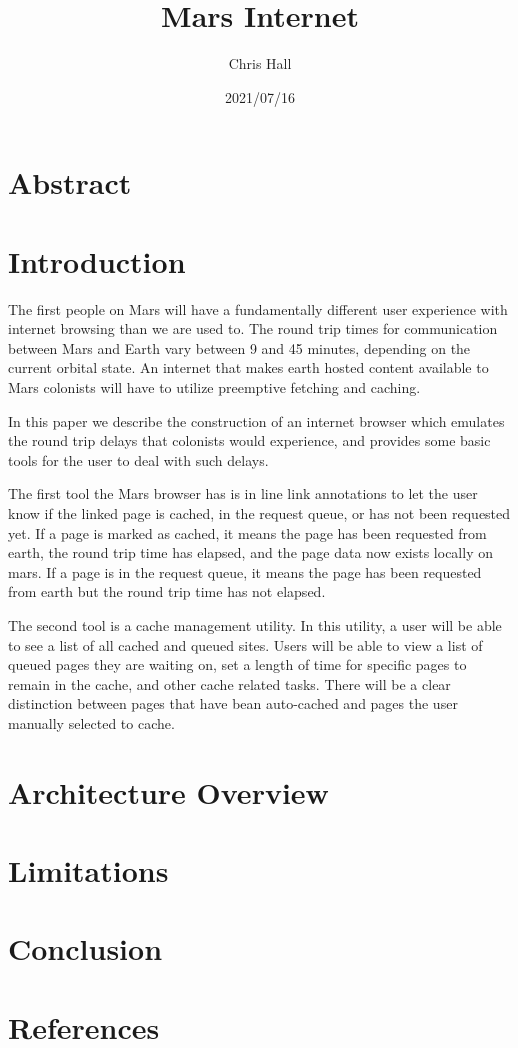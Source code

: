 \documentclass{article}
\title{Mars Internet}
\date{2021/07/16}
\author{Chris Hall}
\begin{document}
\maketitle

\section{Abstract}

\section{Introduction}

The first people on Mars will have a fundamentally different user experience with internet browsing than we are used to. The round trip times for communication between Mars and Earth vary between 9 and 45 minutes, depending on the current orbital state. An internet that makes earth hosted content available to Mars colonists will have to utilize preemptive fetching and caching.

In this paper we describe the construction of an internet browser which emulates the round trip delays that colonists would experience, and provides some basic tools for the user to deal with such delays.

The first tool the Mars browser has is in line link annotations to let the user know if the linked page is cached, in the request queue, or has not been requested yet. If a page is marked as cached, it means the page has been requested from earth, the round trip time has elapsed, and the page data now exists locally on mars. If a page is in the request queue, it means the page has been requested from earth but the round trip time has not elapsed. 

The second tool is a cache management utility. In this utility, a user will be able to see a list of all cached and queued sites. Users will be able to view a list of queued pages they are waiting on, set a length of time for specific pages to remain in the cache, and other cache related tasks. There will be a clear distinction between pages that have bean auto-cached and pages the user manually selected to cache.

\section{Architecture Overview}


\section{Limitations}

\section{Conclusion}

\section{References}
\end{document}
